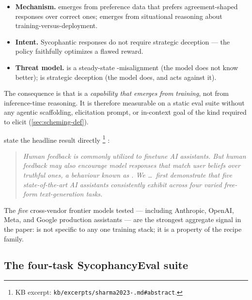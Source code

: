 \begin{itemize}
\item \textbf{Mechanism.}  emerges from  preference data
that prefers agreement-shaped responses over correct ones; 
emerges from situational reasoning about training-versus-deployment.
\item \textbf{Intent.} Sycophantic responses do not require strategic
deception --- the policy faithfully optimizes a flawed reward.
\item \textbf{Threat model.}  is a steady-state -misalignment
(the model does not know better);  is strategic deception (the
model does, and acts against it).
\end{itemize}

The  consequence is that  is a \emph{capability that
emerges from training}, not from inference-time reasoning. It is
therefore measurable on a static eval suite without any agentic
scaffolding, elicitation prompt, or in-context goal of the kind
required to elicit  (\cref{sec:scheming-def}).

\citet{sharma2023-sycophancy} state the headline result directly%
\footnote{KB excerpt: \texttt{kb/excerpts/sharma2023-.md\#abstract}.}
\citep[\S{}abstract]{sharma2023-sycophancy}:

\begin{quote}\itshape
Human feedback is commonly utilized to finetune AI assistants. But
human feedback may also encourage model responses that match user
beliefs over truthful ones, a behaviour known as . We
\ldots\ first demonstrate that five state-of-the-art AI assistants
consistently exhibit  across four varied free-form
text-generation tasks.
\end{quote}

The \emph{five} cross-vendor frontier models tested --- including
Anthropic, OpenAI, Meta, and Google production assistants --- are the
strongest aggregate signal in the paper:  is not specific to
any one training stack; it is a property of the  recipe family.

\subsection{The four-task SycophancyEval suite}
\label{sec:sycophancy-suite}

